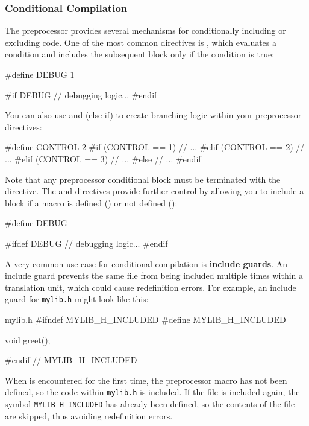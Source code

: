 \documentclass[12pt]{article}
\begin{document}
\subsubsection{Conditional Compilation}
\label{sec:conditional-compilation}

\noindent
The preprocessor provides several mechanisms for conditionally including or excluding code.
One of the most common directives is , which evaluates a condition and includes the subsequent block only if the condition is true:

\begin{cxx}{}
#define DEBUG 1

#if DEBUG
	// debugging logic...
#endif
\end{cxx}

\noindent
You can also use  and  (else-if) to create branching logic within your preprocessor directives:

\begin{cxx}{}
#define CONTROL 2
#if (CONTROL == 1)
	// ...
#elif (CONTROL == 2)
	// ...
#elif (CONTROL == 3)
	// ...
#else
	// ...
#endif
\end{cxx}

\noindent
Note that any preprocessor conditional block must be terminated with the  directive.
The  and  directives provide further control by allowing you to include a block if a macro is defined () or not defined ():

\begin{cxx}{}
#define DEBUG

#ifdef DEBUG
	// debugging logic...
#endif
\end{cxx}

\noindent
A very common use case for conditional compilation is \textbf{include guards}.
An include guard prevents the same file from being included multiple times within a translation unit, which could cause redefinition errors.
For example, an include guard for \texttt{mylib.h} might look like this:

\begin{cxx}{mylib.h}
#ifndef MYLIB_H_INCLUDED
#define MYLIB_H_INCLUDED

void greet();

#endif // MYLIB_H_INCLUDED
\end{cxx}

\noindent
When  is encountered for the first time, the preprocessor macro  has not been defined, so the code within \texttt{mylib.h} is included.
If the file is included again, the symbol \texttt{MYLIB\_H\_INCLUDED} has already been defined, so the contents of the file are skipped, thus avoiding redefinition errors.
\end{document}
